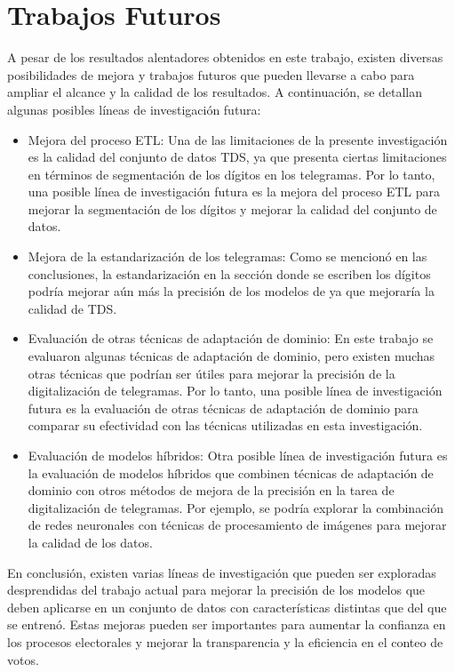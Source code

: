 \section{Trabajos Futuros}

A pesar de los resultados alentadores obtenidos en este trabajo, existen diversas posibilidades de mejora y trabajos
futuros que pueden llevarse a cabo para ampliar el alcance y la calidad de los resultados. A continuación, se detallan
algunas posibles líneas de investigación futura:

\begin{itemize}
    \item Mejora del proceso ETL: Una de las limitaciones de la presente investigación es la calidad del conjunto de datos TDS,
          ya que presenta ciertas limitaciones en términos de segmentación de los dígitos en los telegramas. Por lo tanto, una
          posible línea de investigación futura es la mejora del proceso ETL para mejorar la segmentación de los dígitos y
          mejorar la calidad del conjunto de datos.
    \item Mejora de la estandarización de los telegramas: Como se mencionó en las conclusiones, la estandarización en la sección
          donde se escriben los dígitos podría mejorar aún más la precisión de los modelos de ya que mejoraría la calidad de TDS.
    \item Evaluación de otras técnicas de adaptación de dominio: En este trabajo se evaluaron algunas técnicas de adaptación de
          dominio, pero existen muchas otras técnicas que podrían ser útiles para mejorar la precisión de la digitalización de
          telegramas. Por lo tanto, una posible línea de investigación futura es la evaluación de otras técnicas de adaptación de
          dominio para comparar su efectividad con las técnicas utilizadas en esta investigación.
    \item Evaluación de modelos híbridos: Otra posible línea de investigación futura es la evaluación de modelos híbridos que
          combinen técnicas de adaptación de dominio con otros métodos de mejora de la precisión en la tarea de digitalización de
          telegramas. Por ejemplo, se podría explorar la combinación de redes neuronales con técnicas de procesamiento de
          imágenes para mejorar la calidad de los datos.
\end{itemize}

En conclusión, existen varias líneas de investigación que pueden ser exploradas desprendidas del trabajo actual para
mejorar la precisión de los modelos que deben aplicarse en un conjunto de datos con características distintas que del
que se entrenó. Estas mejoras pueden ser importantes para aumentar la confianza en los procesos electorales y mejorar
la transparencia y la eficiencia en el conteo de votos.